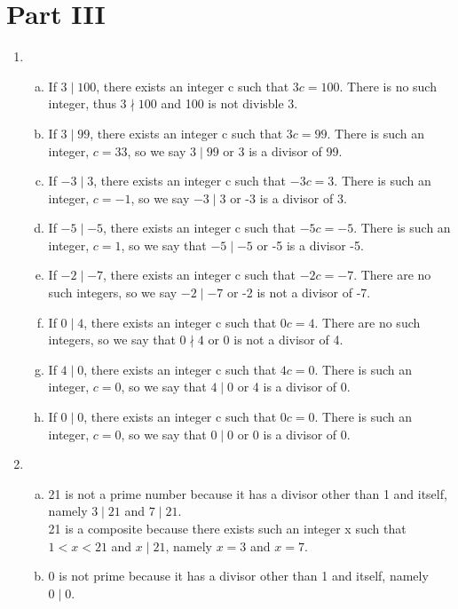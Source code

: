 \documentclass{article}
\begin{document}
\section*{Part III}
\begin{enumerate}[label=(3.\arabic*),start=1]
    \item
        \begin{enumerate}[(a)]
            \item If $3\mid100$, there exists an integer c such that $3c=100$. There is no such integer, thus $3\nmid100$ and 100 is not divisble 3.
            \item If $3\mid99$, there exists an integer c such that $3c=99$. There is such an integer, $c=33$, so we say $3\mid99$ or 3 is a divisor of 99.
            \item If $-3\mid3$, there exists an integer c such that $-3c=3$. There is such an integer, $c=-1$, so we say $-3\mid3$ or -3 is a divisor of 3.
            \item If $-5\mid-5$, there exists an integer c such that $-5c=-5$. There is such an integer, $c=1$, so we say that $-5\mid-5$ or -5 is a divisor -5.
            \item If $-2\mid-7$, there exists an integer c such that $-2c=-7$. There are no such integers, so we say $-2\mid-7$ or -2 is not a divisor of -7.
            \item If $0\mid4$, there exists an integer c such that $0c=4$. There are no such integers, so we say that $0\nmid4$ or 0 is not a divisor of 4.
            \item If $4\mid0$, there exists an integer c such that $4c=0$. There is such an integer, $c=0$, so we say that $4\mid0$ or 4 is a divisor of 0.
            \item If $0\mid0$, there exists an integer c such that $0c=0$. There is such an integer, $c=0$, so we say that $0\mid0$ or 0 is a divisor of 0.
        \end{enumerate}
    \addtocounter{enumi}{1}
    \item
        \begin{enumerate}[(a)]
            \item 21 is not a prime number because it has a divisor other than 1 and itself, namely $3\mid21$ and $7\mid21$.\\
                  21 is a composite because there exists such an integer x such that $1<x<21$ and $x\mid21$, namely $x=3$ and $x=7$.
            \item 0 is not prime because it has a divisor other than 1 and itself, namely $0\mid0$.\\

\end{enumerate}
\end{enumerate}
\end{document}
